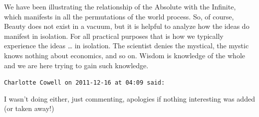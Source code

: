 \begin{footnotesize}
\begin{sffamily}
We have been illustrating the relationship of the Absolute with the Infinite, which manifests in all the permutations of the world process. So, of course, Beauty does not exist in a vacuum, but it is helpful to analyze how the ideas do manifest in isolation. For all practical purposes that is how we typically experience the ideas … in isolation. The scientist denies the mystical, the mystic knows nothing about economics, and so on. Wisdom is knowledge of the whole and we are here trying to gain such knowledge.


\hfill

\texttt{Charlotte Cowell on 2011-12-16 at 04:09 said: }

I wasn't doing either, just commenting, apologies if nothing interesting was added (or taken away!)


\end{sffamily}\end{footnotesize}
